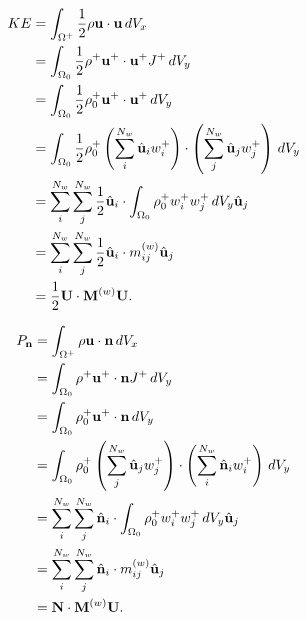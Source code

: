 \documentclass[11pt]{article}
\begin{document}
\begin{align}
    KE &= \int_{\Omega^+} \frac{1}{2} \rho \mathbf{u} \cdot \mathbf{u} \, dV_x \nonumber \\
    &= \int_{\Omega_0} \frac{1}{2} \rho^+ \mathbf{u}^+ \cdot \mathbf{u}^+ J^+ \, dV_y \nonumber \\
    &= \int_{\Omega_0} \frac{1}{2} \rho_0^+ \mathbf{u}^+ \cdot \mathbf{u}^+ \, dV_y \nonumber \\
    &= \int_{\Omega_0} \frac{1}{2} \rho_0^+ \left ( \sum_i^{N_w} \hat{\mathbf{u}}_i w_i^+ \right ) \cdot \left ( \sum_j^{N_w} \hat{\mathbf{u}}_j w_j^+ \right ) \, dV_y \nonumber \\
    &= \sum_i^{N_w} \sum_j^{N_w} \frac{1}{2} \hat{\mathbf{u}}_i \cdot \int_{\Omega_0}\rho_0^+ w_i^+ w_j^+ \, dV_y \hat{\mathbf{u}}_j \nonumber \\
    &= \sum_i^{N_w} \sum_j^{N_w} \frac{1}{2} \hat{\mathbf{u}}_i \cdot m_{ij}^{(w)} \hat{\mathbf{u}}_j \nonumber \\
    &= \frac{1}{2} \mathbf{U} \cdot \mathbf{M}^{(w)} \mathbf{U}.
\end{align}

\begin{align}
    P_{\mathbf{n}} &= \int_{\Omega^+} \rho \mathbf{u} \cdot \mathbf{n} \, dV_x \nonumber \\
    &= \int_{\Omega_0} \rho^+ \mathbf{u}^+ \cdot \mathbf{n} J^+ \, dV_y \nonumber \\
    &= \int_{\Omega_0} \rho^+_0 \mathbf{u}^+ \cdot \mathbf{n} \, dV_y \nonumber \\
    &= \int_{\Omega_0} \rho^+_0 \left ( \sum_j^{N_w} \hat{\mathbf{u}}_j w^+_j \right ) \cdot \left ( \sum_i^{N_w} \hat{\mathbf{n}}_i w_i^+ \right ) \, dV_y \nonumber \\
    &= \sum_i^{N_w} \sum_j^{N_w} \hat{\mathbf{n}}_i \cdot \int_{\Omega_0} \rho_0^+ w_i^+ w_j^+ \, dV_y \hat{\mathbf{u}}_j \nonumber \\
    &= \sum_i^{N_w} \sum_j^{N_w} \hat{\mathbf{n}}_i \cdot m_{ij}^{(w)} \hat{\mathbf{u}}_j \nonumber \\
    &= \mathbf{N} \cdot \mathbf{M}^{(w)} \mathbf{U}.
\end{align}
\end{document}
